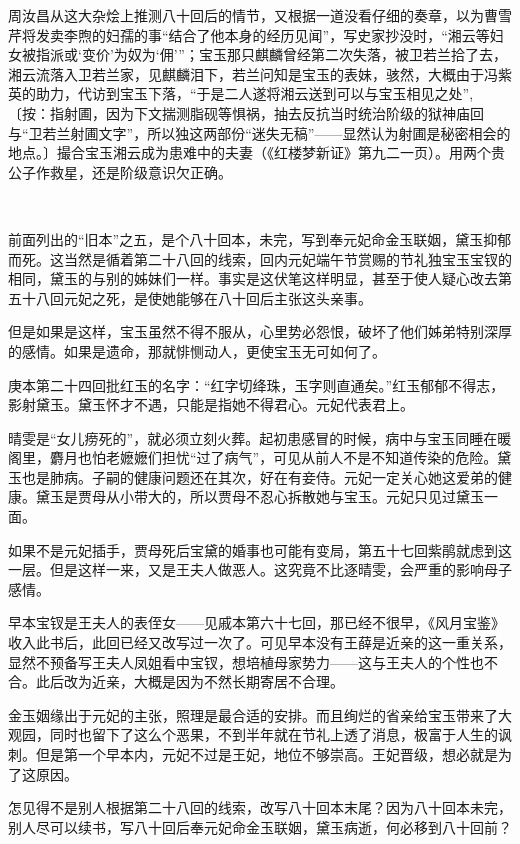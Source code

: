 \par 周汝昌从这大杂烩上推测八十回后的情节，又根据一道没看仔细的奏章，以为曹雪芹将发卖李煦的妇孺的事“结合了他本身的经历见闻”，写史家抄没时，“湘云等妇女被指派或‘变价’为奴为‘佣’”；宝玉那只麒麟曾经第二次失落，被卫若兰拾了去，湘云流落入卫若兰家，见麒麟泪下，若兰问知是宝玉的表妹，骇然，大概由于冯紫英的助力，代访到宝玉下落，“于是二人遂将湘云送到可以与宝玉相见之处”, 〔按：指射圃，因为下文揣测脂砚等惧祸，抽去反抗当时统治阶级的狱神庙回与“卫若兰射圃文字”，所以独这两部份“迷失无稿”——显然认为射圃是秘密相会的地点。〕撮合宝玉湘云成为患难中的夫妻（《红楼梦新证》第九二一页）。用两个贵公子作救星，还是阶级意识欠正确。
\par  
\par 前面列出的“旧本”之五，是个八十回本，未完，写到奉元妃命金玉联姻，黛玉抑郁而死。这当然是循着第二十八回的线索，回内元妃端午节赏赐的节礼独宝玉宝钗的相同，黛玉的与别的姊妹们一样。事实是这伏笔这样明显，甚至于使人疑心改去第五十八回元妃之死，是使她能够在八十回后主张这头亲事。
\par 但是如果是这样，宝玉虽然不得不服从，心里势必怨恨，破坏了他们姊弟特别深厚的感情。如果是遗命，那就悱恻动人，更使宝玉无可如何了。
\par 庚本第二十四回批红玉的名字：“红字切绛珠，玉字则直通矣。”红玉郁郁不得志，影射黛玉。黛玉怀才不遇，只能是指她不得君心。元妃代表君上。
\par 晴雯是“女儿痨死的”，就必须立刻火葬。起初患感冒的时候，病中与宝玉同睡在暖阁里，麝月也怕老嬷嬷们担忧“过了病气”，可见从前人不是不知道传染的危险。黛玉也是肺病。子嗣的健康问题还在其次，好在有妾侍。元妃一定关心她这爱弟的健康。黛玉是贾母从小带大的，所以贾母不忍心拆散她与宝玉。元妃只见过黛玉一面。
\par 如果不是元妃插手，贾母死后宝黛的婚事也可能有变局，第五十七回紫鹃就虑到这一层。但是这样一来，又是王夫人做恶人。这究竟不比逐晴雯，会严重的影响母子感情。
\par 早本宝钗是王夫人的表侄女——见戚本第六十七回，那已经不很早，《风月宝鉴》收入此书后，此回已经又改写过一次了。可见早本没有王薛是近亲的这一重关系，显然不预备写王夫人凤姐看中宝钗，想培植母家势力——这与王夫人的个性也不合。此后改为近亲，大概是因为不然长期寄居不合理。
\par 金玉姻缘出于元妃的主张，照理是最合适的安排。而且绚烂的省亲给宝玉带来了大观园，同时也留下了这么个恶果，不到半年就在节礼上透了消息，极富于人生的讽刺。但是第一个早本内，元妃不过是王妃，地位不够崇高。王妃晋级，想必就是为了这原因。
\par 怎见得不是别人根据第二十八回的线索，改写八十回本末尾？因为八十回本未完，别人尽可以续书，写八十回后奉元妃命金玉联姻，黛玉病逝，何必移到八十回前？
